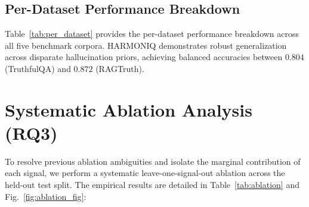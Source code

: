 \documentclass[conference]{IEEEtran}
\begin{document}
\begin{table}[t]
\centering
\caption{Multi-Granular Quantitative Verification Accuracy}
\label{tab:granular}
\end{table}

\subsection{Per-Dataset Performance Breakdown}
Table~\ref{tab:per_dataset} provides the per-dataset performance breakdown across all five benchmark corpora. HARMONIQ demonstrates robust generalization across disparate hallucination priors, achieving balanced accuracies between $0.804$ (TruthfulQA) and $0.872$ (RAGTruth).

\begin{table}[t]
\centering
\caption{Per-Dataset Evaluation Breakdown on Test Splits}
\label{tab:per_dataset}
\end{table}

\section{Systematic Ablation Analysis (RQ3)}
To resolve previous ablation ambiguities and isolate the marginal contribution of each signal, we perform a systematic leave-one-signal-out ablation across the held-out test split. The empirical results are detailed in Table~\ref{tab:ablation} and Fig.~\ref{fig:ablation_fig}:
\end{document}
